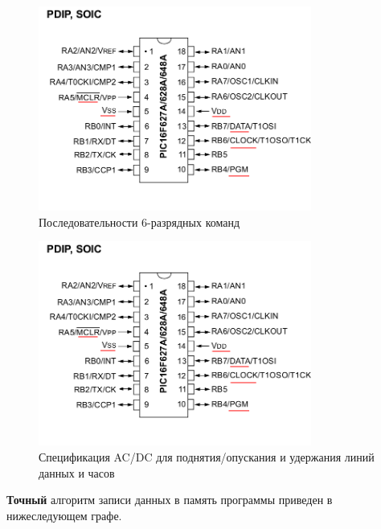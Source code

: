 \begin{figure}[h!]
    \centering
    \includegraphics[width=0.8\textwidth]{2017-05-07_at_22:31:52_screenshot.png}
    \caption{Последовательности 6-разрядных команд}
\end{figure}


\begin{figure}[h!]
    \centering
    \includegraphics[width=0.8\textwidth]{2017-05-07_at_22:31:52_screenshot.png}
    \caption{Спецификация AC/DC для поднятия/опускания и удержания линий данных и часов}
\end{figure}


\textbf{Точный} алгоритм записи данных в память программы приведен в нижеследующем графе.


